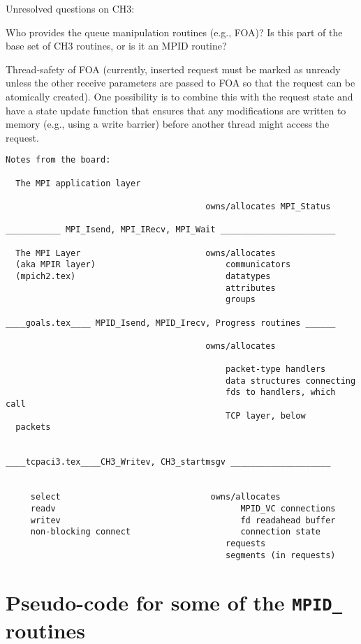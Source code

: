 \documentclass{article}
\def\code#1{\texttt{#1}}
\begin{document}
Unresolved questions on CH3:

Who provides the queue manipulation routines (e.g., FOA)?  Is this part of the
base set of CH3 routines, or is it an MPID routine?  

Thread-safety of FOA (currently, inserted request must be marked as unready
unless the other receive parameters are passed to FOA so that the request can
be atomically created).  One possibility is to combine this with the request
state and have a state update function that ensures that any modifications are
written to memory (e.g., using a write barrier) before another thread might
access the request.


\begin{verbatim}
Notes from the board:

  The MPI application layer

                                        owns/allocates MPI_Status

___________ MPI_Isend, MPI_IRecv, MPI_Wait _______________________

  The MPI Layer                         owns/allocates
  (aka MPIR layer)                          communicators
  (mpich2.tex)                              datatypes
                                            attributes
                                            groups

____goals.tex____ MPID_Isend, MPID_Irecv, Progress routines ______

                                        owns/allocates

                                            packet-type handlers
                                            data structures connecting
                                            fds to handlers, which call
                                            TCP layer, below 
  packets


____tcpaci3.tex____CH3_Writev, CH3_startmsgv ____________________


     select                              owns/allocates
     readv                                     MPID_VC connections
     writev                                    fd readahead buffer
     non-blocking connect                      connection state
                                            requests
                                            segments (in requests)

\end{verbatim}

\section{Pseudo-code for some of the \code{MPID_} routines}
\end{document}

